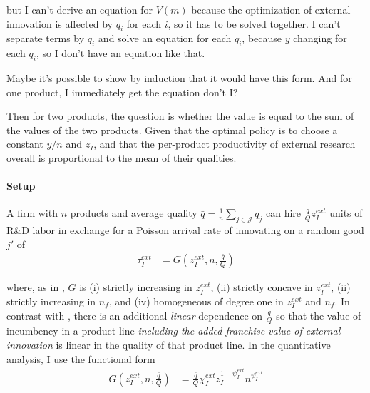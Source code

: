 \documentclass[12pt,english]{article}
\theoremstyle{remark}
\begin{document}
but I can't derive an equation for $V(m)$ because the optimization of external innovation is affected by $q_i$ for each $i$, so it has to be solved together. I can't separate terms by $q_i$ and solve an equation for each $q_i$, because $y$ changing for each $q_i$, so I don't have an equation like that. 

Maybe it's possible to show by induction that it would have this form. And for one product, I immediately get the equation don't I? 

Then for two products, the question is whether the value is equal to the sum of the values of the two products. Given that the optimal policy is to choose a constant $y/n$ and $z_I$, and that the per-product productivity of external research overall is proportional to the mean of their qualities.



\paragraph{Setup}

A firm with $n$ products and average quality $\bar{q} = \frac{1}{n}\sum_{j \in \mathcal{J}} q_{j}$ can hire $\frac{\bar{q}}{Q} z_I^{ext}$ units of R\&D labor in exchange for a Poisson arrival rate of innovating on a random good $j'$ of 
\begin{align}
\tau_I^{ext} &= G(z_I^{ext},n,\frac{\bar{q}}{Q})
\end{align}

where, as in \cite{klette_innovating_2004}, $G$ is (i) strictly increasing in $z_I^{ext}$, (ii) strictly concave in $z_I^{ext}$, (ii) strictly increasing in $n_f$, and (iv) homogeneous of degree one in $z_I^{ext}$ and $n_f$. In contrast with \cite{klette_innovating_2004}, there is an additional \textit{linear} dependence on $\frac{\bar{q}}{Q}$ so that the value of incumbency in a product line \textit{including the added franchise value of external innovation} is linear in the quality of that product line. In the quantitative analysis, I use the functional form 
\begin{align}
G(z_I^{ext},n,\frac{\bar{q}}{Q}) &= \frac{\bar{q}}{Q} \chi_I^{ext} z_I^{1-\psi_I^{ext}} n^{\psi_I^{ext}} 
\end{align}
\end{document}
